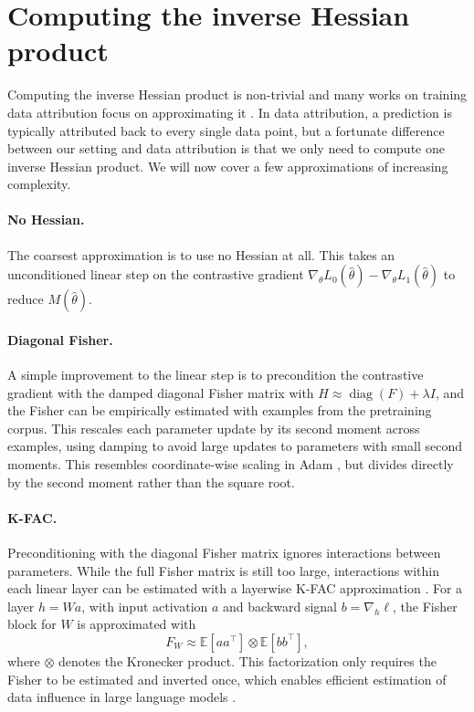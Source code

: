 \documentclass{article}
\begin{document}
\section{Computing the inverse Hessian product}

Computing the inverse Hessian product is non-trivial and many works on training data attribution focus on approximating it \cite{park_trak_2023}. In data attribution, a prediction is typically attributed back to every single data point, but a fortunate difference between our setting and data attribution is that we only need to compute one inverse Hessian product. We will now cover a few approximations of increasing complexity.

\paragraph{No Hessian.} The coarsest approximation is to use no Hessian at all. This takes an unconditioned linear step on the contrastive gradient \(\nabla_\theta L_0(\hat{\theta})- \nabla_\theta L_1(\hat{\theta})\) to reduce $M(\hat{\theta})$.

\paragraph{Diagonal Fisher.} A simple improvement to the linear step is to precondition the contrastive gradient with the damped diagonal Fisher matrix with $H \approx \operatorname{diag}(F)+\lambda I$, and the Fisher can be empirically estimated with examples from the pretraining corpus. This rescales each parameter update by its second moment across examples, using damping to avoid large updates to parameters with small second moments. This resembles coordinate-wise scaling in Adam \cite{kingma2015adam}, but divides directly by the second moment rather than the square root.

\paragraph{K-FAC.} Preconditioning with the diagonal Fisher matrix ignores interactions between parameters. While the full Fisher matrix is still too large, interactions within each linear layer can be estimated with a layerwise K-FAC approximation \cite{martens_optimizing_2015}. For a layer $h=Wa$, with input activation $a$ and backward signal $b=\nabla_h\ell$, the Fisher block for $W$ is approximated with
\begin{equation}
    F_W
    \approx
    \mathbb{E}[aa^\top]
    \otimes
    \mathbb{E}[bb^\top],
\end{equation}
where $\otimes$ denotes the Kronecker product. This factorization only requires the Fisher to be estimated and inverted once, which enables efficient estimation of data influence in large language models \cite{grosse2023studyinglargelanguagemodel}.
\end{document}

